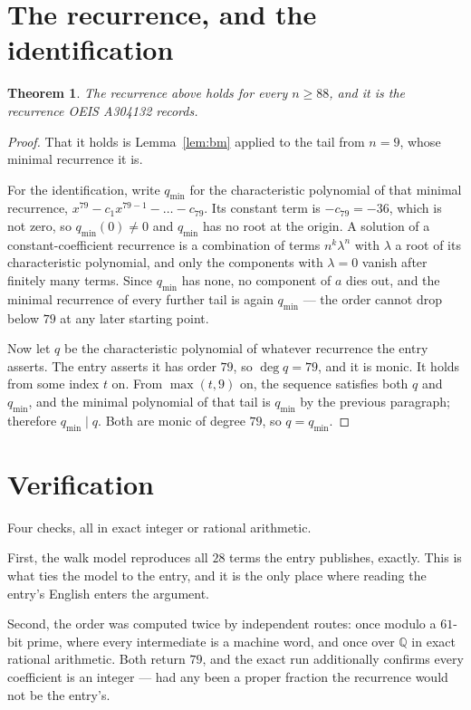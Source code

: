 \documentclass[11pt,a4paper]{article}
\theoremstyle{plain}
\newtheorem{theorem}{Theorem}
\theoremstyle{definition}
\begin{document}
\section{The recurrence, and the identification}

\begin{theorem}
The recurrence above holds for every $n\ge88$, and it is the recurrence OEIS A304132 records.
\end{theorem}

\begin{proof}
That it holds is Lemma~\ref{lem:bm} applied to the tail from $n=9$, whose minimal
recurrence it is.

For the identification, write $q_{\min}$ for the characteristic polynomial of that minimal
recurrence, $x^{79}-c_1x^{79-1}-\dots-c_{79}$. Its constant term is
$-c_{79}=-36$, which is not zero, so $q_{\min}(0)\neq0$ and $q_{\min}$ has no
root at the origin. A solution of a constant-coefficient recurrence is a combination of terms
$n^{k}\lambda^{n}$ with $\lambda$ a root of its characteristic polynomial, and only the
components with $\lambda=0$ vanish after finitely many terms. Since $q_{\min}$ has none, no
component of $a$ dies out, and the minimal recurrence of every further tail is again
$q_{\min}$ --- the order cannot drop below $79$ at any later starting point.

Now let $q$ be the characteristic polynomial of whatever recurrence the entry asserts. The
entry asserts it has order $79$, so $\deg q=79$, and it is monic. It holds from some
index $t$ on. From $\max(t,9)$ on, the sequence satisfies both $q$ and $q_{\min}$, and
the minimal polynomial of that tail is $q_{\min}$ by the previous paragraph; therefore
$q_{\min}\mid q$. Both are monic of degree $79$, so $q=q_{\min}$.
\end{proof}

\section{Verification}

Four checks, all in exact integer or rational arithmetic.

First, the walk model reproduces all $28$ terms the entry publishes, exactly. This is
what ties the model to the entry, and it is the only place where reading the entry's English
enters the argument.

Second, the order was computed twice by independent routes: once modulo a $61$-bit prime, where
every intermediate is a machine word, and once over $\mathbb{Q}$ in exact rational arithmetic.
Both return $79$, and the exact run additionally confirms every coefficient is an integer
--- had any been a proper fraction the recurrence would not be the entry's.
\end{document}
